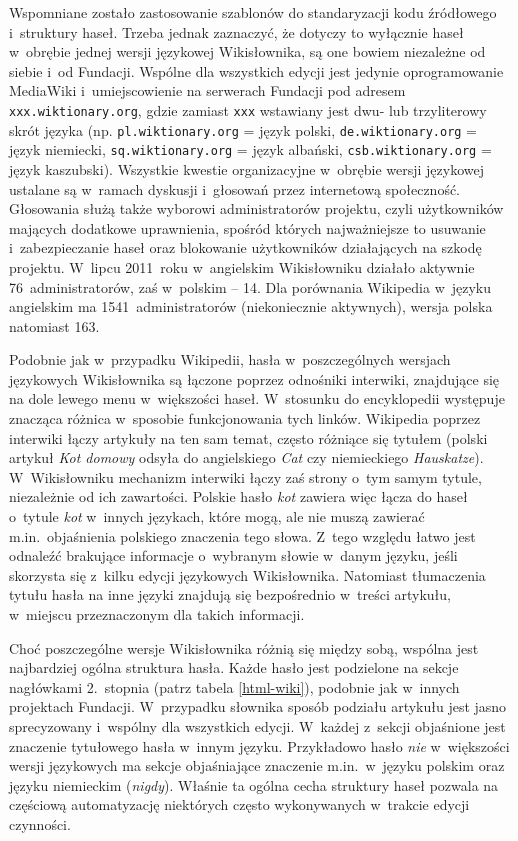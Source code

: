 \documentclass{pracamgr}
\begin{document}
Wspomniane zostało zastosowanie szablonów do standaryzacji kodu źródłowego i~struktury haseł. Trzeba jednak zaznaczyć, że dotyczy to wyłącznie haseł w~obrębie jednej wersji językowej Wikisłownika, są one bowiem niezależne od siebie i~od Fundacji. Wspólne dla wszystkich edycji jest jedynie oprogramowanie MediaWiki i~umiejscowienie na serwerach Fundacji pod adresem \texttt{xxx.wiktionary.org}, gdzie zamiast \texttt{xxx} wstawiany jest dwu- lub trzyliterowy skrót języka (np. \texttt{pl.wiktionary.org} = język polski, \texttt{de.wiktionary.org} = język niemiecki, \texttt{sq.wiktionary.org} = język albański, \texttt{csb.wiktionary.org} = język kaszubski). Wszystkie kwestie organizacyjne w~obrębie wersji językowej ustalane są w~ramach dyskusji i~głosowań przez internetową społeczność. Głosowania służą także wyborowi administratorów projektu, czyli użytkowników mających dodatkowe uprawnienia, spośród których najważniejsze to usuwanie i~zabezpieczanie haseł oraz blokowanie użytkowników działających na szkodę projektu. W~lipcu 2011~roku w~angielskim Wikisłowniku działało aktywnie 76~administratorów, %
zaś w~polskim -- 14. %
Dla porównania Wikipedia w~języku angielskim ma 1541~administratorów (niekoniecznie aktywnych), wersja polska natomiast 163. %

Podobnie jak w~przypadku Wikipedii, hasła w~poszczególnych wersjach językowych Wikisłownika są łączone poprzez odnośniki interwiki, znajdujące się na dole lewego menu w~większości haseł. W~stosunku do encyklopedii występuje znacząca różnica w~sposobie funkcjonowania tych linków. Wikipedia poprzez interwiki łączy artykuły na ten sam temat, często różniące się tytułem (polski artykuł \emph{Kot domowy} odsyła do angielskiego \emph{Cat} czy niemieckiego \emph{Hauskatze}). W~Wikisłowniku mechanizm interwiki łączy zaś strony o~tym samym tytule, niezależnie od ich zawartości. Polskie hasło \emph{kot} zawiera więc łącza do haseł o~tytule \emph{kot} w~innych językach, które mogą, ale nie muszą zawierać m.in.\ objaśnienia polskiego znaczenia tego słowa. Z~tego względu łatwo jest odnaleźć brakujące informacje o~wybranym słowie w~danym języku, jeśli skorzysta się z~kilku edycji językowych Wikisłownika. Natomiast tłumaczenia tytułu hasła na inne języki znajdują się bezpośrednio w~treści artykułu, w~miejscu przeznaczonym dla takich informacji.

Choć poszczególne wersje Wikisłownika różnią się między sobą, wspólna jest najbardziej ogólna struktura hasła. Każde hasło jest podzielone na sekcje nagłówkami 2.~stopnia (patrz tabela \ref{html-wiki}), podobnie jak w~innych projektach Fundacji. W~przypadku słownika sposób podziału artykułu jest jasno sprecyzowany i~wspólny dla wszystkich edycji. W~każdej z~sekcji objaśnione jest znaczenie tytułowego hasła w~innym języku. Przykładowo hasło \emph{nie} w~większości wersji językowych ma sekcje objaśniające znaczenie m.in.\ w~języku polskim oraz języku niemieckim (\emph{nigdy}). Właśnie ta ogólna cecha struktury haseł pozwala na częściową automatyzację niektórych często wykonywanych w~trakcie edycji czynności.
\end{document}
